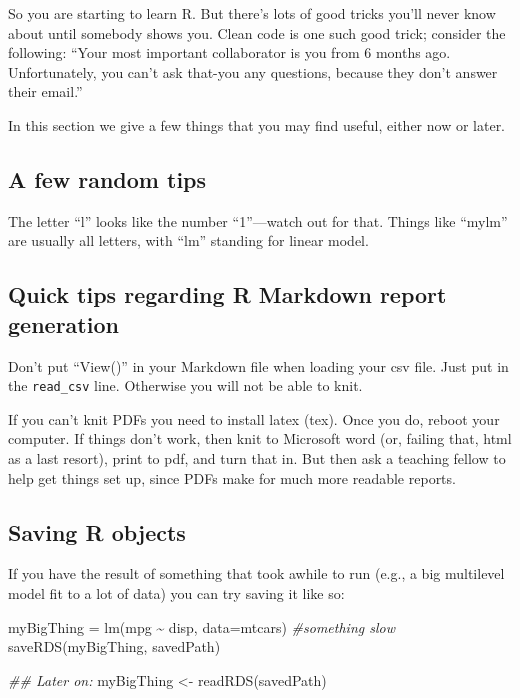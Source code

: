 \documentclass[
  letterpaper,
  DIV=11,
  numbers=noendperiod]{scrreprt}
\newenvironment{Shaded}{\begin{snugshade}}{\end{snugshade}}
\newcommand{\AttributeTok}[1]{\textcolor[rgb]{0.49,0.56,0.16}{#1}}
\newcommand{\CommentTok}[1]{\textcolor[rgb]{0.38,0.63,0.69}{\textit{#1}}}
\newcommand{\DocumentationTok}[1]{\textcolor[rgb]{0.73,0.13,0.13}{\textit{#1}}}
\newcommand{\FunctionTok}[1]{\textcolor[rgb]{0.02,0.16,0.49}{#1}}
\newcommand{\NormalTok}[1]{\textcolor[rgb]{0.00,0.44,0.13}{#1}}
\newcommand{\OtherTok}[1]{\textcolor[rgb]{0.00,0.44,0.13}{#1}}
\newcommand{\SpecialCharTok}[1]{\textcolor[rgb]{0.25,0.44,0.63}{#1}}
\begin{document}
So you are starting to learn R. But there's lots of good tricks you'll
never know about until somebody shows you. Clean code is one such good
trick; consider the following: ``Your most important collaborator is you
from 6 months ago. Unfortunately, you can't ask that-you any questions,
because they don't answer their email.''

In this section we give a few things that you may find useful, either
now or later.

\hypertarget{a-few-random-tips}{%
\subsection{A few random tips}\label{a-few-random-tips}}

The letter ``l'' looks like the number ``1''---watch out for that.
Things like ``mylm'' are usually all letters, with ``lm'' standing for
linear model.

\hypertarget{quick-tips-regarding-r-markdown-report-generation}{%
\subsection{Quick tips regarding R Markdown report
generation}\label{quick-tips-regarding-r-markdown-report-generation}}

Don't put ``View()'' in your Markdown file when loading your csv file.
Just put in the \texttt{read\_csv} line. Otherwise you will not be able
to knit.

If you can't knit PDFs you need to install latex (tex). Once you do,
reboot your computer. If things don't work, then knit to Microsoft word
(or, failing that, html as a last resort), print to pdf, and turn that
in. But then ask a teaching fellow to help get things set up, since PDFs
make for much more readable reports.

\hypertarget{saving-r-objects}{%
\subsection{Saving R objects}\label{saving-r-objects}}

If you have the result of something that took awhile to run (e.g., a big
multilevel model fit to a lot of data) you can try saving it like so:

\begin{Shaded}
\begin{Highlighting}[]
\NormalTok{myBigThing }\OtherTok{=} \FunctionTok{lm}\NormalTok{(mpg }\SpecialCharTok{\textasciitilde{}}\NormalTok{ disp, }\AttributeTok{data=}\NormalTok{mtcars) }\CommentTok{\#something slow}
\FunctionTok{saveRDS}\NormalTok{(myBigThing, savedPath)}

\DocumentationTok{\#\# Later on:}
\NormalTok{myBigThing }\OtherTok{\textless{}{-}} \FunctionTok{readRDS}\NormalTok{(savedPath)}
\end{Highlighting}
\end{Shaded}
\end{document}
